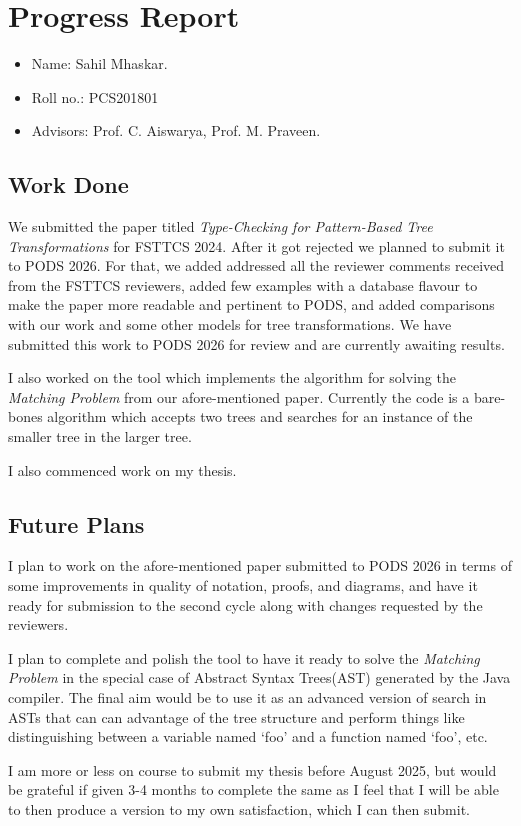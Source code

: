 \section*{Progress Report}

\begin{itemize}
    \item Name: Sahil Mhaskar.
    \item Roll no.: PCS201801
    \item Advisors: Prof. C. Aiswarya, Prof. M. Praveen.
\end{itemize}

\subsection*{Work Done}

We submitted the paper titled \emph{Type-Checking for Pattern-Based Tree Transformations} for FSTTCS 2024. After it got rejected we planned to submit it to PODS 2026. For that, we added addressed all the reviewer comments received from the FSTTCS reviewers, added few examples with a database flavour to make the paper more readable and pertinent to PODS, and added comparisons with our work and some other models for tree transformations. We have submitted this work to PODS 2026 for review and are currently awaiting results.

I also worked on the tool which implements the algorithm for solving the \emph{Matching Problem} from our afore-mentioned paper. Currently the code is a bare-bones algorithm which accepts two trees and searches for an instance of the smaller tree in the larger tree.

I also commenced work on my thesis.

\subsection*{Future Plans}

I plan to work on the afore-mentioned paper submitted to PODS 2026 in terms of some improvements in quality of notation, proofs, and diagrams, and have it ready for submission to the second cycle along with changes requested by the reviewers.

I plan to complete and polish the tool to have it ready to solve the \emph{Matching Problem} in the special case of Abstract Syntax Trees(AST) generated by the Java compiler. The final aim would be to use it as an advanced version of search in ASTs that can can advantage of the tree structure and perform things like distinguishing between a variable named `foo' and a function named `foo', etc.

I am more or less on course to submit my thesis before August 2025, but would be grateful if given 3-4 months to complete the same as I feel that I will be able to then produce a version to my own satisfaction, which I can then submit. 